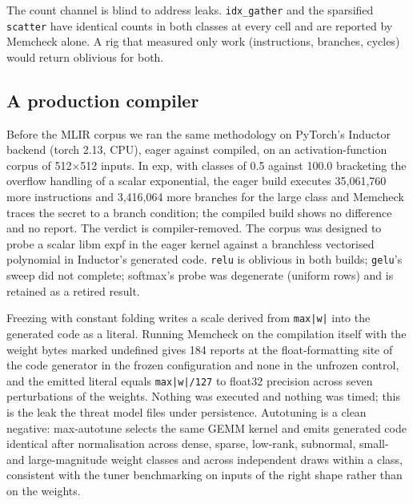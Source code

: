 The count channel is blind to address leaks. \texttt{idx\_gather} and the sparsified \texttt{scatter} have identical counts in both classes at every cell and are reported by Memcheck alone. A rig that measured only work (instructions, branches, cycles) would return oblivious for both.

\subsection{A production compiler}\label{sec:production}

Before the MLIR corpus we ran the same methodology on PyTorch's Inductor backend (torch 2.13, CPU), eager against compiled, on an activation-function corpus of 512×512 inputs. In exp, with classes of 0.5 against 100.0 bracketing the overflow handling of a scalar exponential, the eager build executes 35,061,760 more instructions and 3,416,064 more branches for the large class and Memcheck traces the secret to a branch condition; the compiled build shows no difference and no report. The verdict is compiler-removed. The corpus was designed to probe a scalar libm expf in the eager kernel against a branchless vectorised polynomial in Inductor's generated code. \texttt{relu} is oblivious in both builds; \texttt{gelu}'s sweep did not complete; softmax's probe was degenerate (uniform rows) and is retained as a retired result.

Freezing with constant folding writes a scale derived from \texttt{max|w|} into the generated code as a literal. Running Memcheck on the compilation itself with the weight bytes marked undefined gives 184 reports at the float-formatting site of the code generator in the frozen configuration and none in the unfrozen control, and the emitted literal equals \texttt{max|w|/127} to float32 precision across seven perturbations of the weights. Nothing was executed and nothing was timed; this is the leak the threat model files under persistence. Autotuning is a clean negative: max-autotune selects the same GEMM kernel and emits generated code identical after normalisation across dense, sparse, low-rank, subnormal, small- and large-magnitude weight classes and across independent draws within a class, consistent with the tuner benchmarking on inputs of the right shape rather than on the weights.